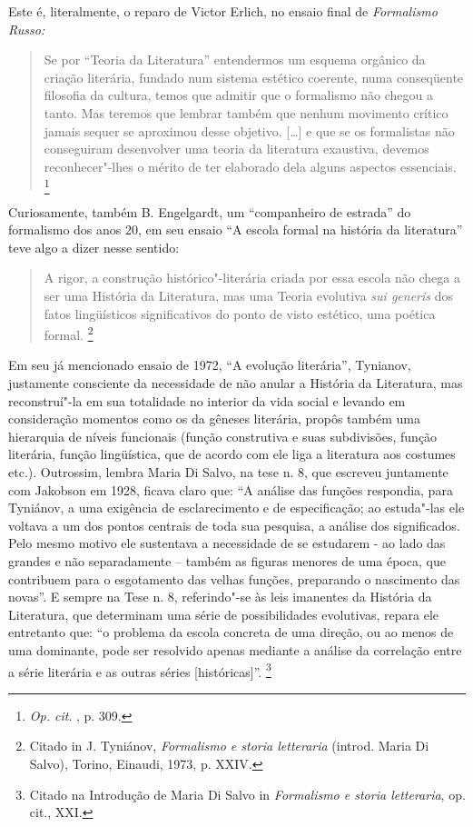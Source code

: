 Este é, literalmente, o reparo de Victor Erlich, no ensaio final de
\emph{Formalismo Russo:}

\begin{quote}
Se por ``Teoria da Literatura'' entendermos um esquema orgânico da
criação literária, fundado num sistema estético coerente, numa
conseqüente filosofia da cultura, temos que admitir que o formalismo não
chegou a tanto. Mas teremos que lembrar também que nenhum movimento
crítico jamais sequer se aproximou desse objetivo. {[}\ldots{}{]} e que se os
formalistas não conseguiram desenvolver uma teoria da literatura
exaustiva, devemos reconhecer"-lhes o mérito de ter elaborado dela alguns
aspectos essenciais. \footnote{\emph{Op. cit}. , p. 309.}
\end{quote}

Curiosamente, também B. Engelgardt, um ``companheiro de estrada'' do
formalismo dos anos 20, em seu ensaio ``A escola formal na história da
literatura'' teve algo a dizer nesse sentido:

\begin{quote}
A rigor, a construção histórico"-literária criada por essa escola não
chega a ser uma História da Literatura, mas uma Teoria evolutiva
\emph{sui generis} dos fatos lingüísticos significativos do ponto de
visto estético, uma poética formal. \footnote{Citado in J. Tyniánov,
  \emph{Formalismo e storia letteraria} (introd. Maria Di Salvo),
  Torino, Einaudi, 1973, p. XXIV.}
\end{quote}

Em seu já mencionado ensaio de 1972, ``A evolução literária'', Tynianov,
justamente consciente da necessidade de não anular a História da
Literatura, mas reconstruí"-la em sua totalidade no interior da vida
social e levando em consideração momentos como os da gêneses literária,
propôs também uma hierarquia de níveis funcionais (função construtiva e
suas subdivisões, função literária, função lingüística, que de acordo
com ele liga a literatura aos costumes etc.). Outrossim, lembra Maria Di
Salvo, na tese n. 8, que escreveu juntamente com Jakobson em 1928,
ficava claro que: ``A análise das funções respondia, para Tyniánov, a
uma exigência de esclarecimento e de especificação; ao estuda"-las ele
voltava a um dos pontos centrais de toda sua pesquisa, a análise dos
significados. Pelo mesmo motivo ele sustentava a necessidade de se
estudarem - ao lado das grandes e não separadamente -- também as figuras
menores de uma época, que contribuem para o esgotamento das velhas
funções, preparando o nascimento das novas''. E sempre na Tese n. 8,
referindo"-se às leis imanentes da História da Literatura, que determinam
uma série de possibilidades evolutivas, repara ele entretanto que: ``o
problema da escola concreta de uma direção, ou ao menos de uma
dominante, pode ser resolvido apenas mediante a análise da correlação
entre a série literária e as outras séries {[}históricas{]}''.
\footnote{Citado na Introdução de Maria Di Salvo in \emph{Formalismo e
  storia letteraria}, op. cit., XXI.}

